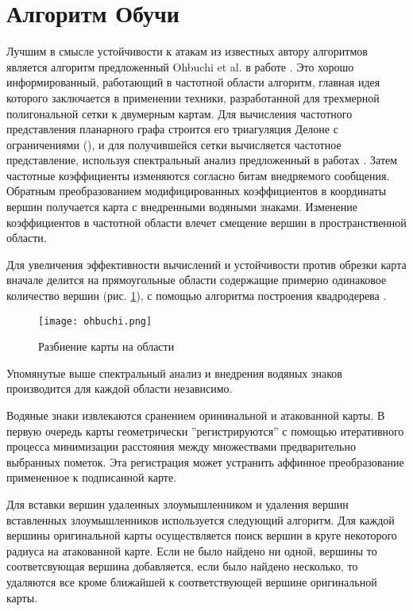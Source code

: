 \section{Алгоритм Обучи}
\label{sec:base}

Лучшим в смысле устойчивости к атакам из известных автору алгоритмов является алгоритм предложенный 
Ohbuchi et al. в работе \cite{Ohbuchi}. Это хорошо информированный, работающий в частотной области алгоритм,
главная идея которого заключается в применении техники, разработанной для трехмерной полигональной сетки к
двумерным картам.
Для вычисления частотного представления планарного графа строится его триагуляция Делоне с ограничениями 
(\cite{Chew}), и для получившейся сетки вычисляется частотное представление, используя спектральный анализ 
предложенный в работах \cite{Karni1, Karni2}. Затем частотные коэффициенты изменяются согласно битам 
внедряемого сообщения. Обратным преобразованием модифицированных коэффициентов в координаты вершин получается
карта с внедренными водяными знаками. Изменение коэффициентов в частотной области влечет смещение вершин в 
пространственной области.

Для увеличения эффективности вычислений и устойчивости против обрезки карта вначале делится на прямоугольные 
области содержащие примерно одинаковое количество вершин (рис. \ref{pic_ohbuchi}), с помощью алгоритма
построения квадродерева \cite{Samet}. 
\begin{figure}
  \centering
  \texttt{[image: ohbuchi.png]}
  \caption{Разбиение карты на области}
  \label{pic_ohbuchi}
\end{figure}
Упомянутые выше спектральный анализ и внедрения водяных знаков производится для каждой области независимо.

Водяные знаки извлекаются сранением орининальной и атакованной карты. В первую очередь карты геометрически
''регистрируются'' с помощью итеративного процесса минимизации расстояния между множествами предварительно
выбранных пометок. Эта регистрация может устранить аффинное преобразование примененное к подписанной карте.

Для вставки вершин удаленных злоумышленником и удаления вершин вставленных злоумышленников используется 
следующий алгоритм. Для каждой вершины оригинальной
карты осуществляется поиск вершин в круге некоторого радиуса на атакованной карте. Если не было найдено ни одной,
вершины то соответсвующая вершина добавляется, если было найдено несколько, то удаляются все кроме ближайшей
к соответствующей вершине оригинальной карты.

